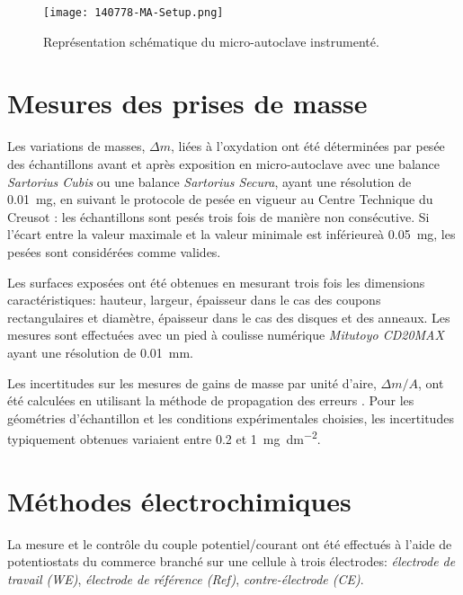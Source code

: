\begin{refsection}
    \begin{figure}[H]
        \centering
            \texttt{[image: 140778-MA-Setup.png]}
        \caption{Représentation schématique du micro-autoclave instrumenté.}
        \label{fig:ch2_MA_scheme}
    \end{figure}
   
    

\section{Mesures des prises de masse}\label{sec:ch2_weighting}

    Les variations de masses, $\Delta m$, liées à l'oxydation ont été déterminées par pesée des échantillons avant 
    et après exposition en micro-autoclave
    avec une balance \emph{Sartorius Cubis} ou une balance \emph{Sartorius Secura}, ayant une résolution de
    \SI{0.01}{\milli\gram},
    en suivant le protocole de pesée en vigueur au Centre Technique du Creusot \citep{Perche2015}: les échantillons sont pesés
    trois fois de manière non consécutive. Si l'écart entre la valeur maximale et la valeur
    minimale est inférieureà \SI{0.05}{\milli\gram}, les pesées sont considérées comme valides. 
    
    Les surfaces exposées ont été obtenues en mesurant trois fois les dimensions
    caractéristiques: hauteur, largeur, épaisseur dans le cas des coupons rectangulaires et diamètre,
    épaisseur
    dans le cas des disques et des anneaux. Les mesures sont effectuées avec un pied à coulisse numérique \emph{Mitutoyo
    CD20MAX} ayant une résolution de \SI{0.01}{\milli\meter}.

    Les incertitudes sur les mesures de gains de masse par unité d'aire, $\Delta m /A$, ont été calculées en utilisant la méthode 
    de propagation des erreurs \citep{Protassov2002,Bevington2003}. 
    Pour les géométries d'échantillon et les conditions expérimentales choisies, les incertitudes
    typiquement obtenues variaient entre 0.2 et \SI{1}{\milli\gram\per\square\deci\meter}.



\section{Méthodes électrochimiques}\label{sec:ch2_electrochemistry}

    La mesure et le contrôle du couple potentiel/courant ont été effectués à l'aide de potentiostats du commerce 
    branché sur une cellule à trois
    électrodes: \emph{électrode de travail (WE)}, \emph{électrode de référence (Ref)}, \emph{contre-électrode (CE)}.


\end{refsection}
